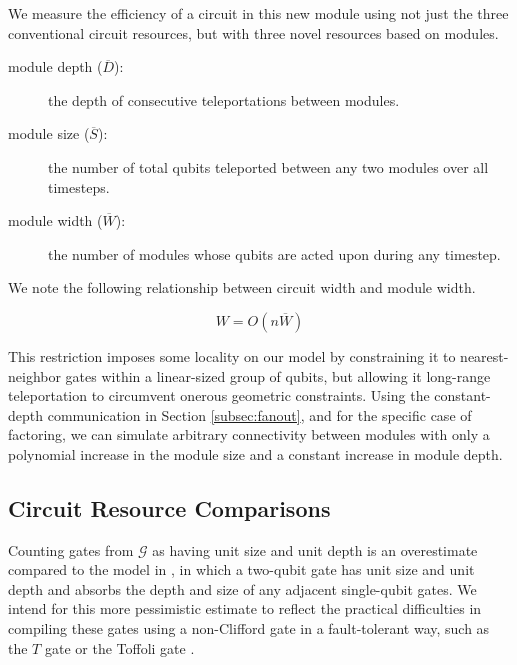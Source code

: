 \documentclass[twoside]{article}
\begin{document}
We measure the efficiency of a circuit in this new module using not just
the three conventional circuit resources, but with three novel resources
based on modules.

\begin{description}

\item[module depth ($\overline{D}$):] the depth of consecutive teleportations between modules.
\item[module size ($\overline{S}$):] the number of total qubits teleported between any two modules over all timesteps.
\item[module width ($\overline{W}$):] the number of modules whose qubits are
acted upon during any timestep.

\end{description}



We note the following relationship between circuit width and
module width.

\begin{equation}
W = O(n\overline{W})
\label{eqn:module-width}
\end{equation}

This restriction imposes some locality on our model by constraining it to
nearest-neighbor gates within a linear-sized group of qubits, but allowing
it long-range teleportation to circumvent onerous geometric constraints.
Using the constant-depth communication in Section \ref{subsec:fanout}, and for
the specific case of factoring, we
can simulate arbitrary connectivity between modules with only a polynomial
increase in the module size and a constant increase in module depth.

\subsection{Circuit Resource Comparisons}

Counting gates from $\mathcal{G}$ as having unit size and unit depth
is
an overestimate compared to the model in \cite{Kutin2006}, in which a
two-qubit gate has unit size and unit depth and
absorbs the depth and size of any adjacent single-qubit gates. We intend
for this more pessimistic estimate to reflect the practical difficulties
in compiling these gates using a non-Clifford gate in a fault-tolerant way,
such as the $T$ gate or the Toffoli gate
\cite{Fowler2011}.
\end{document}
